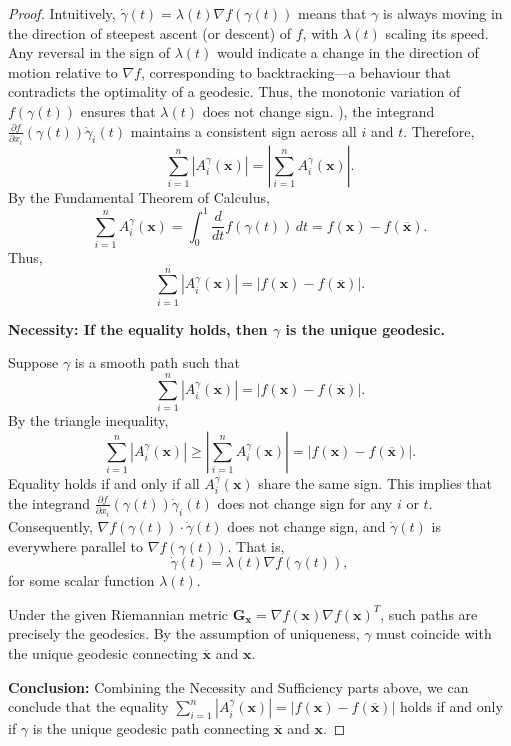 \begin{proof}
{		Intuitively, $\dot{\gamma}(t)=\lambda(t)\nabla f(\gamma(t))$ means that $\gamma$ is always moving in the direction of steepest ascent (or descent) of $f$, with $\lambda(t)$ scaling its speed. Any reversal in the sign of $\lambda(t)$ would indicate a change in the direction of motion relative to $\nabla f$, corresponding to backtracking—a behaviour that contradicts the optimality of a geodesic. Thus, the monotonic variation of $f(\gamma(t))$ ensures that $\lambda(t)$ does not change sign.
		}), the integrand \( \frac{\partial f}{\partial x_i}(\gamma(t)) \dot{\gamma}_i(t) \) maintains a consistent sign across all \( i \) and \( t \). Therefore,
	\[
	\sum_{i=1}^n \left| A_i^{\gamma}(\mathbf{x}) \right| = \left| \sum_{i=1}^n A_i^{\gamma}(\mathbf{x}) \right|.
	\]
	By the Fundamental Theorem of Calculus,
	\[
	\sum_{i=1}^n A_i^{\gamma}(\mathbf{x}) = \int_0^1 \frac{d}{dt} f(\gamma(t)) \, dt = f(\mathbf{x}) - f(\overline{\mathbf{x}}).
	\]
	Thus,
	\[
	\sum_{i=1}^n \left| A_i^{\gamma}(\mathbf{x}) \right| = \left| f(\mathbf{x}) - f(\overline{\mathbf{x}}) \right|.
	\]

	\noindent
	\textbf{Necessity: If the equality holds, then \( \gamma \) is the unique geodesic.}
	
	Suppose \( \gamma \) is a smooth path such that
	\[
	\sum_{i=1}^n \left| A_i^{\gamma}(\mathbf{x}) \right| = \left| f(\mathbf{x}) - f(\overline{\mathbf{x}}) \right|.
	\]
	By the triangle inequality,
	\[
	\sum_{i=1}^n \left| A_i^{\gamma}(\mathbf{x}) \right| \geq \left| \sum_{i=1}^n A_i^{\gamma}(\mathbf{x}) \right| = \left| f(\mathbf{x}) - f(\overline{\mathbf{x}}) \right|.
	\]
	Equality holds if and only if all \( A_i^{\gamma}(\mathbf{x}) \) share the same sign. This implies that the integrand \( \frac{\partial f}{\partial x_i}(\gamma(t)) \dot{\gamma}_i(t) \) does not change sign for any \( i \) or \( t \). Consequently, \( \nabla f(\gamma(t)) \cdot \dot{\gamma}(t) \) does not change sign, and \( \dot{\gamma}(t) \) is everywhere parallel to \( \nabla f(\gamma(t)) \). That is,
	\[
	\dot{\gamma}(t) = \lambda(t) \nabla f(\gamma(t)),
	\]
	for some scalar function \( \lambda(t) \).
	
	Under the given Riemannian metric \( \mathbf{G}_{\mathbf{x}} = \nabla f(\mathbf{x}) \nabla f(\mathbf{x})^T \), such paths are precisely the geodesics. By the assumption of uniqueness, \( \gamma \) must coincide with the unique geodesic connecting \( \overline{\mathbf{x}} \) and \( \mathbf{x} \).
	
	\noindent
	\textbf{Conclusion:} Combining the Necessity and Sufficiency parts above, we can conclude that 
	the equality \( \sum_{i=1}^n \left| A_i^{\gamma}(\mathbf{x}) \right| = \left| f(\mathbf{x}) - f(\overline{\mathbf{x}}) \right| \) holds if and only if \( \gamma \) is the unique geodesic path connecting \( \overline{\mathbf{x}} \) and \( \mathbf{x} \).
\end{proof}
\newpage


